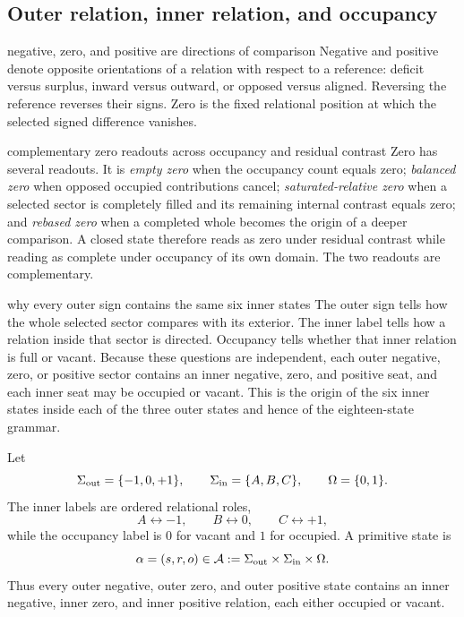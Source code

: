 \documentclass[11pt]{article}
\numberwithin{equation}{section}
\theoremstyle{remark}
\begin{document}
\label{sec:grammar}

\subsection{Outer relation, inner relation, and occupancy}
\begin{interpretivebridge}{negative, zero, and positive are directions of comparison}
Negative and positive denote opposite orientations of a relation with respect to a reference: deficit versus surplus, inward versus outward, or opposed versus aligned. Reversing the reference reverses their signs. Zero is the fixed relational position at which the selected signed difference vanishes.
\end{interpretivebridge}
\begin{conceptledger}{complementary zero readouts across occupancy and residual contrast}
Zero has several readouts. It is \emph{empty zero} when the occupancy count equals zero; \emph{balanced zero} when opposed occupied contributions cancel; \emph{saturated-relative zero} when a selected sector is completely filled and its remaining internal contrast equals zero; and \emph{rebased zero} when a completed whole becomes the origin of a deeper comparison. A closed state therefore reads as zero under residual contrast while reading as complete under occupancy of its own domain. The two readouts are complementary.
\end{conceptledger}
\begin{interpretivebridge}{why every outer sign contains the same six inner states}
The outer sign tells how the whole selected sector compares with its exterior. The inner label tells how a relation inside that sector is directed. Occupancy tells whether that inner relation is full or vacant. Because these questions are independent, each outer negative, zero, or positive sector contains an inner negative, zero, and positive seat, and each inner seat may be occupied or vacant. This is the origin of the six inner states inside each of the three outer states and hence of the eighteen-state grammar.
\end{interpretivebridge}

Let
\begin{equation}
\Sigma_{\rm out}=\{-1,0,+1\},\qquad
\Sigma_{\rm in}=\{A,B,C\},\qquad
\Omega=\{0,1\}.
\end{equation}
The inner labels are ordered relational roles,
\begin{equation}
A\leftrightarrow -1,\qquad B\leftrightarrow 0,\qquad C\leftrightarrow +1,
\end{equation}
while the occupancy label is $0$ for vacant and $1$ for occupied. A primitive state is
\begin{equation}
\alpha=(s,r,o)\in\mathcal A:=\Sigma_{\rm out}\times\Sigma_{\rm in}\times\Omega.
\end{equation}
Thus every outer negative, outer zero, and outer positive state contains an inner negative, inner zero, and inner positive relation, each either occupied or vacant.
\end{document}
